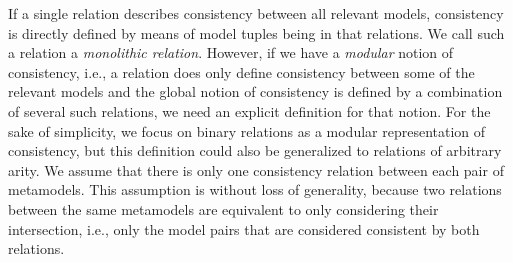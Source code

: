 If a single relation describes consistency between all relevant models, consistency is directly defined by means of model tuples being in that relations. We call such a relation a \emph{monolithic relation}.
However, if we have a \emph{modular} notion of consistency, i.e., a relation does only define consistency between some of the relevant models and the global notion of consistency is defined by a combination of several such relations, we need an explicit definition for that notion.
For the sake of simplicity, we focus on binary relations as a modular representation of consistency, but this definition could also be generalized to relations of arbitrary arity.
We assume that there is only one consistency relation between each pair of metamodels.
This assumption is without loss of generality, because two relations between the same metamodels are equivalent to only considering their intersection, i.e., only the model pairs that are considered consistent by both relations.


